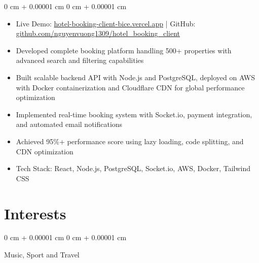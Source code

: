 \documentclass[10pt, letterpaper]{article}
\newenvironment{highlights}{
    \begin{itemize}[
        topsep=0.10 cm,
        parsep=0.10 cm,
        partopsep=0pt,
        itemsep=0pt,
        leftmargin=0 cm + 10pt
    ]
}{
    \end{itemize}
} %
\newenvironment{onecolentry}{
    \begin{adjustwidth}{
        0 cm + 0.00001 cm
    }{
        0 cm + 0.00001 cm
    }
}{
    \end{adjustwidth}
} %
\begin{document}
        \vspace{0.15 cm}
        \begin{onecolentry}
            \begin{highlights}
                \item Live Demo: \href{https://hotel-booking-client-bice.vercel.app}{hotel-booking-client-bice.vercel.app} | GitHub: \href{https://github.com/nguyenvuong1309/hotel_booking_client}{github.com/nguyenvuong1309/hotel\_booking\_client}
                \item Developed complete booking platform handling 500+ properties with advanced search and filtering capabilities
                \item Built scalable backend API with Node.js and PostgreSQL, deployed on AWS with Docker containerization and Cloudflare CDN for global performance optimization
                \item Implemented real-time booking system with Socket.io, payment integration, and automated email notifications
                \item Achieved 95\%+ performance score using lazy loading, code splitting, and CDN optimization
                \item Tech Stack: React, Node.js, PostgreSQL, Socket.io, AWS, Docker, Tailwind CSS
            \end{highlights}
        \end{onecolentry}

    \section{Interests}

        \begin{onecolentry}
            Music, Sport and Travel
        \end{onecolentry}
\end{document}
